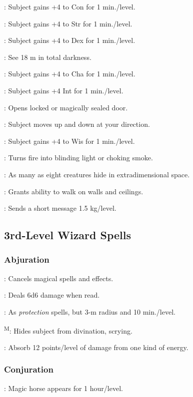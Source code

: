 	: Subject gains +4 to Con for 1 min./level.

	: Subject gains +4 to Str for 1 min./level.

	: Subject gains +4 to Dex for 1 min./level.

	: See 18 m in total darkness.

	: Subject gains +4 to Cha for 1 min./level.

	: Subject gains +4 Int for 1 min./level.

	: Opens locked or magically sealed door.

	: Subject moves up and down at your direction.

	: Subject gains +4 to Wis for 1 min./level.

	: Turns fire into blinding light or choking smoke.

	: As many as eight creatures hide in extradimensional space.

	: Grants ability to walk on walls and ceilings.

	: Sends a short message 1.5 kg/level.



\subsection{3rd-Level Wizard Spells}

\subsubsection{Abjuration}
	: Cancels magical spells and effects.

	: Deals 6d6 damage when read.

	: As \emph{protection} spells, but 3-m radius and 10 min./level.

	\textsuperscript{M}: Hides subject from divination, scrying.

	: Absorb 12 points/level of damage from one kind of energy.

\subsubsection{Conjuration}
	: Magic horse appears for 1 hour/level.


